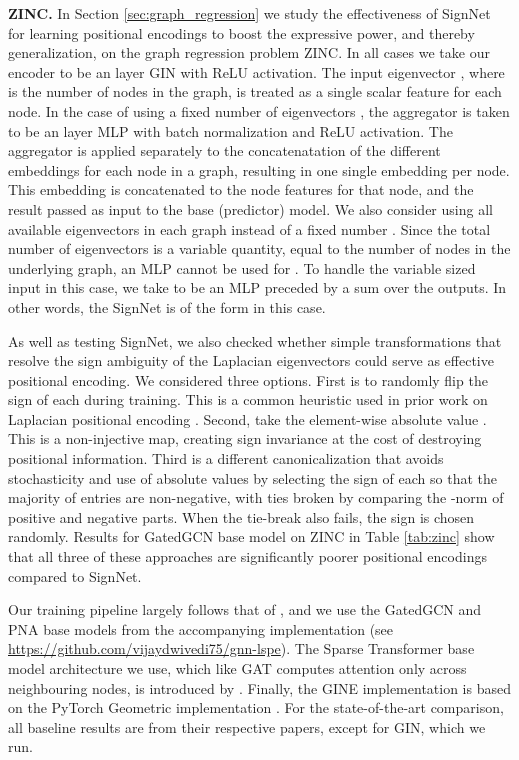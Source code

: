 \documentclass{article} \usepackage{iclr2023_conference,times}
\begin{document}
\textbf{ZINC.} In Section \ref{sec:graph_regression} we study the effectiveness of SignNet for learning positional encodings to boost the expressive power, and thereby generalization, on the graph regression problem ZINC. In all cases we take our  encoder to be an  layer GIN with ReLU activation. The input eigenvector , where  is the number of nodes in the graph, is treated as a single scalar feature for each node. In the case of using a fixed number of eigenvectors , the aggregator  is taken to be an  layer MLP with batch normalization and ReLU activation. The aggregator   is applied separately to the concatenatation of the  different embeddings for each node in a graph, resulting in one single embedding per node. This embedding  is concatenated to the node features for 
that node, and the result passed as input to the base (predictor) model. We also consider using all available eigenvectors in each graph instead of a fixed number . Since the total number of eigenvectors is a variable quantity, equal to the number of  nodes in the underlying graph, an MLP cannot be used for . 
To handle the variable sized input in this case, we take  to be an MLP preceded by a sum over the  outputs. In other words, the SignNet is of the form  in this case.

As well as testing SignNet,  we also checked whether simple transformations that resolve the sign ambiguity of the Laplacian eigenvectors  could serve as effective positional encoding. We considered three options. First is to randomly flip the sign of each  during training. This is a common heuristic used in prior work on Laplacian positional encoding \citep{kreuzer2021rethinking,dwivedi2020benchmarking}. Second,  take the element-wise absolute value . This is a non-injective map, creating sign invariance at the cost of destroying positional information. Third is a different canonicalization that avoids stochasticity and use of  absolute values by selecting the sign of each  so that the majority of entries are non-negative, with ties broken by comparing the -norm of positive and negative parts. When the tie-break also fails, the sign is chosen randomly. Results for GatedGCN base model on ZINC in Table \ref{tab:zinc} show that all three of these approaches are  significantly  poorer positional encodings compared to SignNet. 

Our training pipeline largely follows that of \cite{dwivedi2022graph}, and we use the GatedGCN and PNA base models from the accompanying implementation (see \url{https://github.com/vijaydwivedi75/gnn-lspe}). The Sparse Transformer base model architecture we use, which like GAT computes attention only across neighbouring nodes, is introduced by \cite{kreuzer2021rethinking}. Finally, the GINE implementation is based on the PyTorch Geometric implementation \citep{fey2019fast}. For the state-of-the-art comparison, all baseline results are from their respective papers, except for GIN, which we run.
\end{document}
